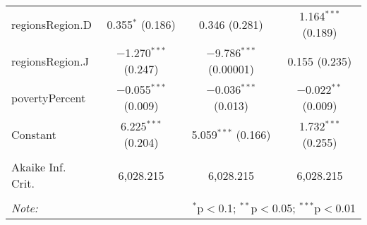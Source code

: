 \begin{table}[!htbp]
\begin{tabular}{@{\extracolsep{5pt}}lccc}
  regionsRegion.D & 0.355$^{*}$ (0.186) & 0.346 (0.281) & 1.164$^{***}$ (0.189) \\ 
  regionsRegion.J & $-$1.270$^{***}$ (0.247) & $-$9.786$^{***}$ (0.00001) & 0.155 (0.235) \\ 
  povertyPercent & $-$0.055$^{***}$ (0.009) & $-$0.036$^{***}$ (0.013) & $-$0.022$^{**}$ (0.009) \\ 
  Constant & 6.225$^{***}$ (0.204) & 5.059$^{***}$ (0.166) & 1.732$^{***}$ (0.255) \\ 
 \hline \\[-1.8ex] 
Akaike Inf. Crit. & 6,028.215 & 6,028.215 & 6,028.215 \\ 
\hline 
\hline \\[-1.8ex] 
\textit{Note:}  & \multicolumn{3}{r}{$^{*}$p$<$0.1; $^{**}$p$<$0.05; $^{***}$p$<$0.01} \\ 
\end{tabular} 
\end{table} 
